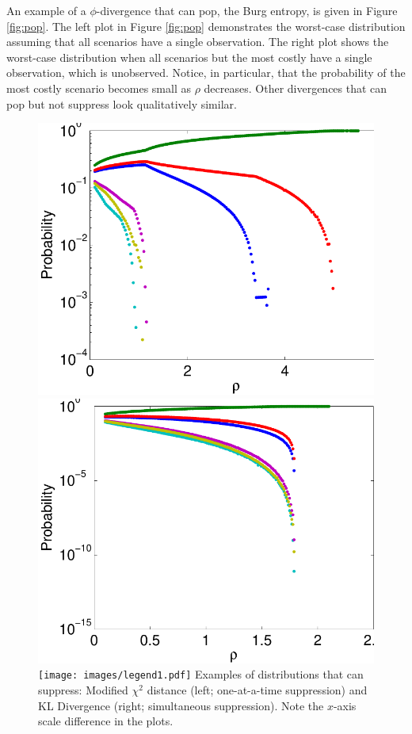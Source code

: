 \documentclass[opre,nonblindrev]{informs3} %
\begin{document}
An example of a $\phi$-divergence that can pop, the Burg entropy, is given in Figure \ref{fig:pop}.
The left plot in Figure \ref{fig:pop} demonstrates the worst-case distribution assuming that all scenarios have a single observation.
The right plot shows the worst-case distribution when all scenarios but the most costly have a single observation, which is unobserved.
Notice, in particular, that the probability of the most costly scenario becomes small as $\rho$ decreases.
Other divergences that can pop but not suppress look qualitatively similar.

\begin{figure}[htb]
	\FIGURE
	{%
		\includegraphics*[width=.40\textwidth]{images/mchi2}%
		\includegraphics*[width=.40\textwidth]{images/kl}%
		\texttt{[image: images/legend1.pdf]}
	}
	{
		Examples of distributions that can suppress: Modified $\chi^2$ distance (left; one-at-a-time suppression) and KL Divergence (right; simultaneous suppression).
		Note the $x$-axis scale difference in the plots.
		\label{fig:suppress}
	}
	{}
\end{figure}
\end{document}
